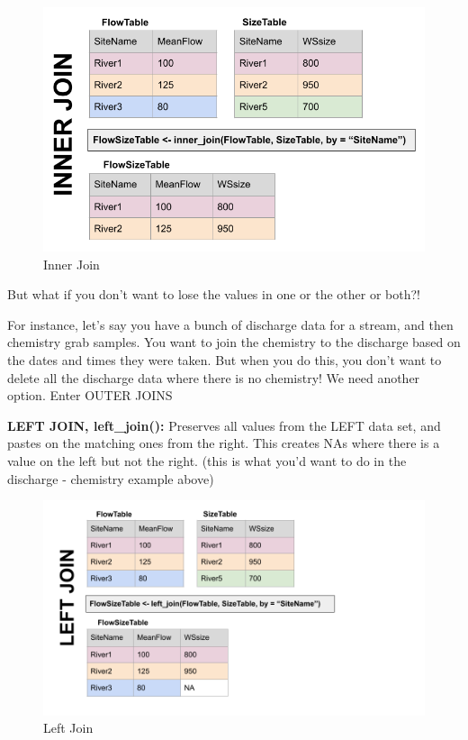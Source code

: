 \documentclass[
]{book}
\begin{document}
\begin{figure}
\centering
\includegraphics{images/innerjoin.png}
\caption{Inner Join}
\end{figure}

But what if you don't want to lose the values in one or the other or both?!

For instance, let's say you have a bunch of discharge data for a stream, and then chemistry grab samples. You want to join the chemistry to the discharge based on the dates and times they were taken. But when you do this, you don't want to delete all the discharge data where there is no chemistry! We need another option. Enter OUTER JOINS

\textbf{LEFT JOIN, left\_join():} Preserves all values from the LEFT data set, and pastes on the matching ones from the right. This creates NAs where there is a value on the left but not the right. (this is what you'd want to do in the discharge - chemistry example above)

\begin{figure}
\centering
\includegraphics{images/leftjoin1.png}
\caption{Left Join}
\end{figure}
\end{document}
